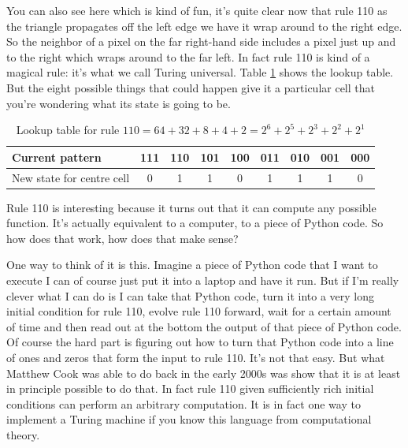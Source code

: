 \documentclass[]{article}
\begin{document}
You can also see here which is kind of fun, it's quite clear now that rule 110 as the triangle propagates off the left edge we have it wrap around to the right edge.
So the neighbor of a pixel on the far right-hand side includes a pixel just up and to the right which wraps around to the far left.
In fact rule 110 is kind of a magical rule: it's what we call Turing universal.
Table \ref{table:rule-110} shows the lookup table. But the eight possible things that could happen give it a particular cell that you're wondering what its state is going to be.
\begin{table}[H]
	\caption[Lookup table for rule 110]{Lookup table for rule $110 = 64 + 32 + 8 + 4 + 2 = 2^6 + 2^5 + 2^3 + 2^2 +2^1$}\label{table:rule-110}
	\begin{tabular}{|l|c|c|c|c|c|c|c|c|}\hline
		Current pattern&111&110&101&100&011&010&001&000\\ \hline
		New state for centre cell&0&1&1&0&1&1&1&0\\ \hline
	\end{tabular}
\end{table}


Rule 110 is interesting because it turns out that it can compute any possible function. 
It's actually equivalent to a computer, to a piece of Python code.
So how does that work, how does that make sense?

One way to think of it is this. Imagine a piece of Python code that I want to execute I can of course just put it into a laptop and have it run. 
But if I'm really clever what I can do is I can take that Python code, turn it into a very long initial condition for rule 110, evolve rule 110 forward, wait for a certain amount of time and then read out at the bottom the output of that piece of Python code.
Of course the hard part is figuring out how to turn that Python code into a line of ones and zeros that form the input to rule 110.
It's not that easy.
But what Matthew Cook was able to do back in the early 2000s
was show that it is at least in principle possible to do that.\cite{cook2004universality}
In fact rule 110 given sufficiently rich initial conditions can perform an arbitrary computation.
It is in fact one way to implement a Turing machine if you know this language from computational theory.
\end{document}
